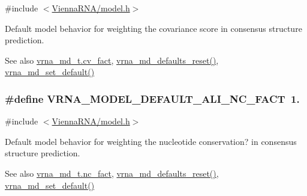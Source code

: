 {\ttfamily \#include $<$\hyperlink{model_8h}{Vienna\+R\+N\+A/model.\+h}$>$}



Default model behavior for weighting the covariance score in consensus structure prediction. 

\begin{DoxySeeAlso}{See also}
\hyperlink{group__model__details_a62ebefb9d0643e5c4c8a2ec84a105ce6}{vrna\+\_\+md\+\_\+t.\+cv\+\_\+fact}, \hyperlink{group__model__details_ga70834424cf804d149937de89f80ceb45}{vrna\+\_\+md\+\_\+defaults\+\_\+reset()}, \hyperlink{group__model__details_ga8ac6ff84936282436f822644bf841f66}{vrna\+\_\+md\+\_\+set\+\_\+default()} 
\end{DoxySeeAlso}
\subsubsection[{\texorpdfstring{V\+R\+N\+A\+\_\+\+M\+O\+D\+E\+L\+\_\+\+D\+E\+F\+A\+U\+L\+T\+\_\+\+A\+L\+I\+\_\+\+N\+C\+\_\+\+F\+A\+CT}{VRNA_MODEL_DEFAULT_ALI_NC_FACT}}]{\setlength{\rightskip}{0pt plus 5cm}\#define V\+R\+N\+A\+\_\+\+M\+O\+D\+E\+L\+\_\+\+D\+E\+F\+A\+U\+L\+T\+\_\+\+A\+L\+I\+\_\+\+N\+C\+\_\+\+F\+A\+CT~1.}\hypertarget{group__model__details_ga8f774daaafec28160c1ca5d09f2cbdba}{}\label{group__model__details_ga8f774daaafec28160c1ca5d09f2cbdba}


{\ttfamily \#include $<$\hyperlink{model_8h}{Vienna\+R\+N\+A/model.\+h}$>$}



Default model behavior for weighting the nucleotide conservation? in consensus structure prediction. 

\begin{DoxySeeAlso}{See also}
\hyperlink{group__model__details_abcf568e6124bfcb2f847ff4eb0dfded6}{vrna\+\_\+md\+\_\+t.\+nc\+\_\+fact}, \hyperlink{group__model__details_ga70834424cf804d149937de89f80ceb45}{vrna\+\_\+md\+\_\+defaults\+\_\+reset()}, \hyperlink{group__model__details_ga8ac6ff84936282436f822644bf841f66}{vrna\+\_\+md\+\_\+set\+\_\+default()} 
\end{DoxySeeAlso}


